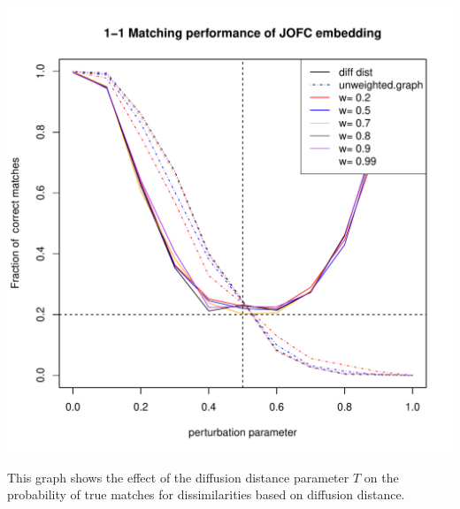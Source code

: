 \documentclass[11pt]{article} %
\begin{document}
\begin{knitrout}
\color{fgcolor}\includegraphics{graphs/FidCommPapergraph-plot-4} 
\end{knitrout}



This graph shows the effect of the diffusion distance parameter $T$ on the probability of true matches for dissimilarities based on diffusion distance.
\end{document}
